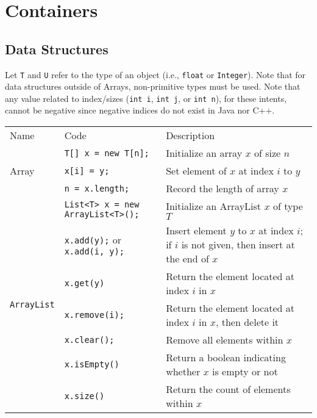 \documentclass{article}
\begin{document}
\section{Containers}
\subsection{Data Structures}
Let \lstinline|T| and \lstinline|U| refer to the type of an object (i.e., \lstinline|float| or \lstinline|Integer|). Note that for data structures outside of Arrays, non-primitive types must be used.
Note that any value related to index/sizes (\lstinline|int i|, \lstinline|int j|, or \lstinline|int n|), for these intents, cannot be negative since negative indices do not exist in Java nor C++.
\setlength{\tabcolsep}{3pt}
\begin{center}\begin{tabularx}{\textwidth}{llX}\toprule
  Name & Code & Description\\
  \multirow{3}{*}{Array} & \lstinline|T[] x = new T[n];| & Initialize an array \(x\) of size \(n\)\\
                         & \lstinline|x[i] = y;| & Set element of \(x\) at index \(i\) to \(y\)\\
                         & \lstinline|n = x.length;| & Record the length of array \(x\) \\\midrule
  \multirow{7}{*}[-0.5em]{\lstinline|ArrayList|} & \lstinline|List<T> x = new ArrayList<T>();| & Initialize an ArrayList \(x\) of type \(T\)\\
                                         & \lstinline|x.add(y);| or \lstinline|x.add(i, y);| & Insert element \(y\) to \(x\) at index \(i\); if \(i\) is not given, then insert at the end of \(x\)\\
                                         & \lstinline|x.get(y)| & Return the element located at index \(i\) in \(x\) \\
                                         & \lstinline|x.remove(i);| & Return the element located at index \(i\) in \(x\), then delete it\\
                                         & \lstinline|x.clear();| & Remove all elements within \(x\)\\
                                         & \lstinline|x.isEmpty()| & Return a boolean indicating whether \(x\) is empty or not\\
                                         & \lstinline|x.size()| & Return the count of elements within \(x\)\\\midrule

\end{tabularx}
\end{center}
\end{document}
